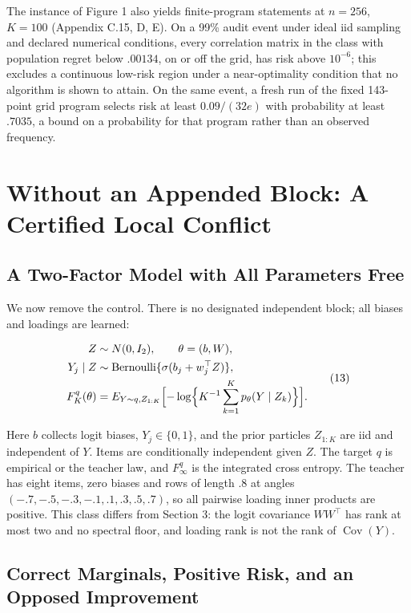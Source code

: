 \documentclass{article}
\begin{document}
The instance of Figure 1 also yields finite-program statements at
\(n=256\), \(K=100\) (Appendix C.15, D, E). On a 99\% audit event under
ideal iid sampling and declared numerical conditions, every correlation
matrix in the class with population regret below \(.00134\), on or off
the grid, has risk above \(10^{-6}\); this excludes a continuous
low-risk region under a near-optimality condition that no algorithm is
shown to attain. On the same event, a fresh run of the fixed 143-point
grid program selects risk at least \(0.09/(32e)\) with probability at
least \(.7035\), a bound on a probability for that program rather than
an observed frequency.

\section{Without an Appended Block: A Certified Local
Conflict}\label{without-an-appended-block-a-certified-local-conflict}

\subsection{A Two-Factor Model with All Parameters
Free}\label{a-two-factor-model-with-all-parameters-free}

We now remove the control. There is no designated independent block; all
biases and loadings are learned:

\[
\begin{aligned}
Z&\sim N(0,I_2),\qquad \theta=(b,W),\\
Y_j\mid Z&\sim\operatorname{Bernoulli}
 \{\sigma(b_j+w_j^\top Z)\},\\
F_K^q(\theta)&=E_{Y\sim q,Z_{1:K}}\Bigl[
-\log\Bigl\{K^{-1}\sum_{k=1}^K
p_\theta(Y\mid Z_k)\Bigr\}\Bigr].
\end{aligned}
\tag{13}
\]

Here \(b\) collects logit biases, \(Y_j\in\{0,1\}\), and the prior
particles \(Z_{1:K}\) are iid and independent of \(Y\). Items are
conditionally independent given \(Z\). The target \(q\) is empirical or
the teacher law, and \(F_\infty^q\) is the integrated cross entropy. The
teacher has eight items, zero biases and rows of length \(.8\) at angles
\((-.7,-.5,-.3,-.1,.1,.3,.5,.7)\), so all pairwise loading inner
products are positive. This class differs from Section 3: the logit
covariance \(WW^\top\) has rank at most two and no spectral floor, and
loading rank is not the rank of \(\operatorname{Cov}(Y)\).

\subsection{Correct Marginals, Positive Risk, and an Opposed
Improvement}\label{correct-marginals-positive-risk-and-an-opposed-improvement}
\end{document}
